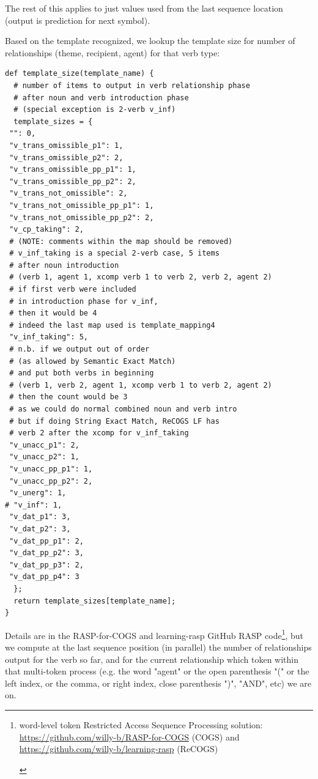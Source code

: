 \documentclass[11pt]{article}
\begin{document}
The rest of this applies to just values used from the last sequence location (output is prediction for next symbol).

Based on the template recognized, we lookup the template size for number of relationships (theme, recipient, agent) for that verb type:
\begin{tiny}
\begin{verbatim}
def template_size(template_name) {
  # number of items to output in verb relationship phase
  # after noun and verb introduction phase
  # (special exception is 2-verb v_inf)
  template_sizes = {
 "": 0,
 "v_trans_omissible_p1": 1,
 "v_trans_omissible_p2": 2,
 "v_trans_omissible_pp_p1": 1,
 "v_trans_omissible_pp_p2": 2,
 "v_trans_not_omissible": 2,
 "v_trans_not_omissible_pp_p1": 1,
 "v_trans_not_omissible_pp_p2": 2,
 "v_cp_taking": 2,
 # (NOTE: comments within the map should be removed)
 # v_inf_taking is a special 2-verb case, 5 items
 # after noun introduction
 # (verb 1, agent 1, xcomp verb 1 to verb 2, verb 2, agent 2)
 # if first verb were included 
 # in introduction phase for v_inf,
 # then it would be 4
 # indeed the last map used is template_mapping4
 "v_inf_taking": 5,
 # n.b. if we output out of order
 # (as allowed by Semantic Exact Match)
 # and put both verbs in beginning
 # (verb 1, verb 2, agent 1, xcomp verb 1 to verb 2, agent 2)
 # then the count would be 3
 # as we could do normal combined noun and verb intro
 # but if doing String Exact Match, ReCOGS LF has
 # verb 2 after the xcomp for v_inf_taking
 "v_unacc_p1": 2,
 "v_unacc_p2": 1,
 "v_unacc_pp_p1": 1,
 "v_unacc_pp_p2": 2,
 "v_unerg": 1,
# "v_inf": 1,
 "v_dat_p1": 3,
 "v_dat_p2": 3,
 "v_dat_pp_p1": 2,
 "v_dat_pp_p2": 3,
 "v_dat_pp_p3": 2,
 "v_dat_pp_p4": 3
  };
  return template_sizes[template_name];
}
\end{verbatim}
\end{tiny}

Details are in the RASP-for-COGS and learning-rasp GitHub RASP code\footnote{\begin{footnotesize}word-level token Restricted Access Sequence Processing solution: \href{https://github.com/willy-b/RASP-for-COGS}{https://github.com/willy-b/RASP-for-COGS} (COGS) and \href{https://github.com/willy-b/learning-rasp}{https://github.com/willy-b/learning-rasp} (ReCOGS) \end{footnotesize}}, but we compute at the last sequence position (in parallel) the number of relationships output for the verb so far, and for the current relationship which token within that multi-token process (e.g. the word "agent" or the open parenthesis "(" or the left index, or the comma, or right index, close parenthesis ")", "AND", etc) we are on.
\end{document}
